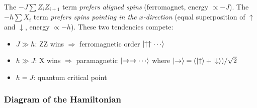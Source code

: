 \documentclass[11pt, a4paper]{article}
\begin{document}
The $-J\sum Z_i Z_{i+1}$ term \emph{prefers aligned spins} (ferromagnet, energy $\propto -J$).
The $-h\sum X_i$ term \emph{prefers spins pointing in the $x$-direction} (equal superposition of $\uparrow$ and $\downarrow$, energy $\propto -h$). These two tendencies compete:
\begin{itemize}
  \item $J \gg h$: ZZ wins $\Rightarrow$ ferromagnetic order $\ket{\uparrow\uparrow\cdots}$
  \item $h \gg J$: X wins $\Rightarrow$ paramagnetic $\ket{\rightarrow\rightarrow\cdots}$ where $\ket{\rightarrow}=(\ket{\uparrow}+\ket{\downarrow})/\sqrt{2}$
  \item $h = J$: quantum critical point
\end{itemize}

\subsubsection*{Diagram of the Hamiltonian}
\end{document}
